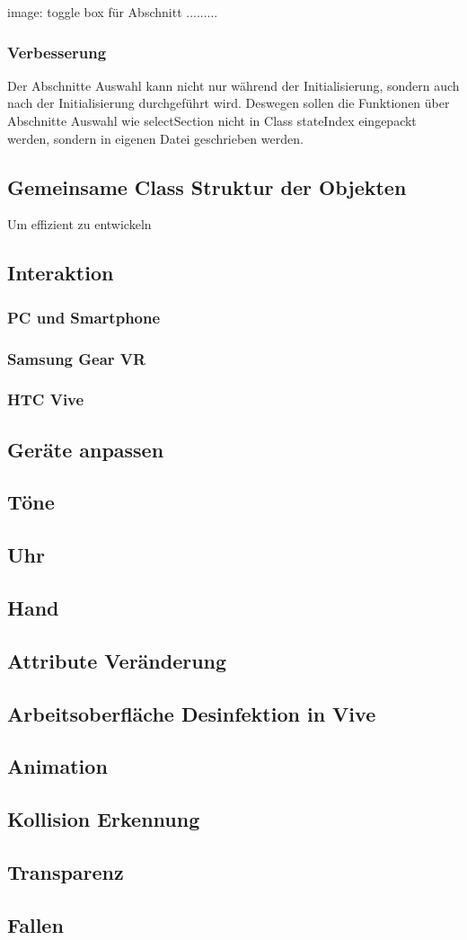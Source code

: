   image: toggle box für Abschnitt .........
  
  \subsubsection{Verbesserung}
  Der Abschnitte Auswahl kann nicht nur während der Initialisierung, sondern auch nach der Initialisierung durchgeführt wird. Deswegen sollen die Funktionen über Abschnitte Auswahl wie selectSection nicht in Class stateIndex eingepackt werden, sondern in eigenen Datei geschrieben werden.
  
 \subsection{Gemeinsame Class Struktur der Objekten}
 Um effizient zu entwickeln 
 
 \subsection{Interaktion}
  \subsubsection{PC und Smartphone}
  \subsubsection{Samsung Gear VR}
  \subsubsection{HTC Vive}
 \subsection{Geräte anpassen}
 \subsection{Töne}
 \subsection{Uhr}
 \subsection{Hand}
 \subsection{Attribute Veränderung}
 
 \subsection{Arbeitsoberfläche Desinfektion in Vive}
 \subsection{Animation}
 \subsection{Kollision Erkennung}
 \subsection{Transparenz}
 \subsection{Fallen}


